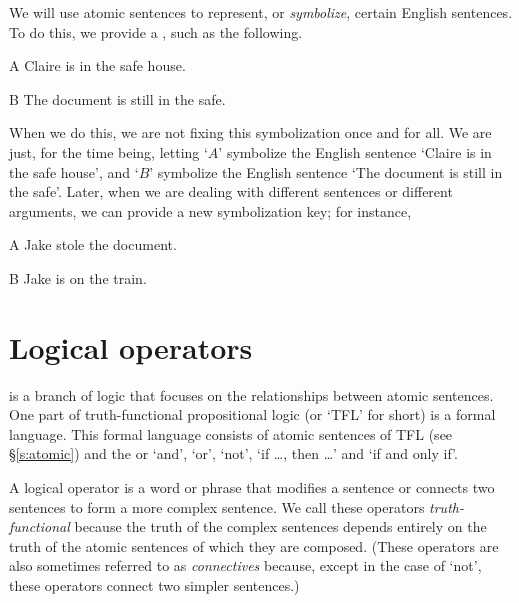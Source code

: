 We will use atomic sentences to represent, or \emph{symbolize}, certain English sentences. To do this, we provide a , such as the following.
	\begin{ekey}
		\item[A] Claire is in the safe house.
		\item[B] The document is still in the safe.
	\end{ekey}
When we do this, we are not fixing this symbolization once and for all. We are just, for the time being, letting `$A$' symbolize the English sentence `Claire is in the safe house', and `$B$' symbolize the English sentence `The document is still in the safe'. Later, when we are dealing with different sentences or different arguments, we can provide a new symbolization key; for instance, 
	\begin{ekey}
		\item[A] Jake stole the document.
		\item[B] Jake is on the train.
	\end{ekey}






\chapter{Logical operators}
\label{s:TFLConnectives}

 is a branch of logic that focuses on the relationships between atomic sentences. One part of truth-functional propositional logic (or `TFL' for short) is a formal language. This formal language consists of atomic sentences of TFL (see \S \ref{s:atomic}) and the  or  `and', `or', `not', `if \ldots, then \ldots' and `if and only if'. 

A logical operator is a word or phrase that modifies a sentence or connects two sentences to form a more complex sentence. We call these operators \textit{truth-functional} because the truth of the complex sentences depends entirely on the truth of the atomic sentences of which they are composed. (These operators are also sometimes referred to as \textit{connectives} because, except in the case of `not', these operators connect two simpler sentences.)  

